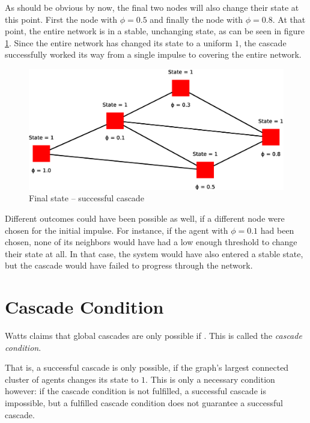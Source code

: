 \documentclass{sig-alternate-05-2015}
\begin{document}
As should be obvious by now, the final two nodes will also change their state at this point. First the node with $\phi = 0.5$ and finally the node with $\phi = 0.8$. At that point, the entire network is in a stable, unchanging state, as can be seen in figure \ref{fig:model5}. Since the entire network has changed its state to a uniform $1$, the cascade successfully worked its way from a single impulse to covering the entire network.

\begin{figure}[h!]
    \includegraphics[width=\columnwidth]{../presentation/img/model9}
    \centering
    \caption{Final state -- successful cascade}
    \label{fig:model5}
\end{figure}

Different outcomes could have been possible as well, if a different node were chosen for the initial impulse. For instance, if the agent with $\phi = 0.1$ had been chosen, none of its neighbors would have had a low enough threshold to change their state at all. In that case, the system would have also entered a stable state, but the cascade would have failed to progress through the network.


\section{Cascade Condition}\label{sec:section}

Watts claims that global cascades are only possible if . This is called the \emph{cascade condition}.

That is, a successful cascade is only possible, if the graph's largest connected cluster of agents changes its state to $1$. This is only a necessary condition however: if the cascade condition is not fulfilled, a successful cascade is impossible, but a fulfilled cascade condition does not guarantee a successful cascade.
\end{document}

